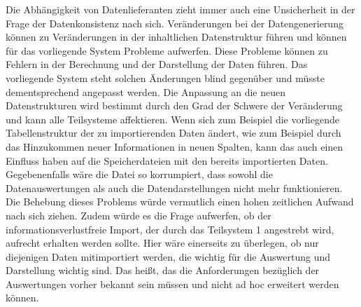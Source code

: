     Die Abhängigkeit von Datenlieferanten zieht immer auch eine Unsicherheit in der Frage der Datenkonsistenz
    nach sich. Veränderungen bei der Datengenerierung können zu Veränderungen in der inhaltlichen Datenstruktur führen und
    können für das vorliegende System Probleme aufwerfen.
    Diese Probleme können zu Fehlern in der Berechnung und der Darstellung der Daten führen. 
    Das vorliegende System steht solchen Änderungen blind gegenüber und müsste dementsprechend angepasst werden. 
    Die Anpassung an die neuen Datenstrukturen wird bestimmt durch den Grad der Schwere der Veränderung und kann alle Teilsysteme affektieren. 
    Wenn sich zum Beispiel die vorliegende Tabellenstruktur der zu importierenden Daten ändert, wie zum Beispiel 
    durch das Hinzukommen neuer Informationen in neuen Spalten, kann das auch einen Einfluss haben 
    auf die Speicherdateien mit den bereits importierten Daten. Gegebenenfalls wäre die Datei so korrumpiert,
    dass sowohl die Datenauswertungen als auch die Datendarstellungen nicht mehr funktionieren. Die Behebung dieses Problems 
    würde vermutlich einen hohen zeitlichen Aufwand nach sich ziehen. Zudem würde es die Frage aufwerfen, 
    ob der informationsverlustfreie Import, der durch das Teilsystem 1 angestrebt wird, aufrecht erhalten werden sollte.
    Hier wäre einerseits zu überlegen, ob nur diejenigen Daten mitimportiert werden, die wichtig für die Auswertung
    und Darstellung wichtig sind. Das heißt, das die Anforderungen bezüglich der Auswertungen vorher bekannt sein müssen und
    nicht ad hoc erweitert werden können.
 